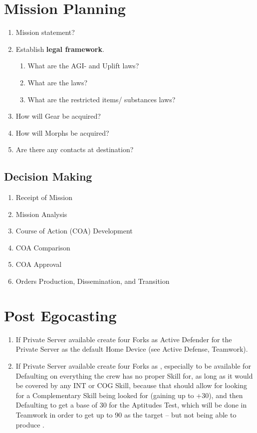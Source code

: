 
\section{Mission Planning}

\begin{enumerate}
    \item Mission statement?
    \item Establish \textbf{legal framework}. 
    \begin{enumerate}
        \item What are the AGI- and Uplift laws?
        \item What are the  laws?
        \item What are the restricted items/ substances laws?
    \end{enumerate}
    \item How will Gear be acquired?
    \item How will Morphs be acquired?
    \item Are there any contacts at destination?
\end{enumerate}


\subsection{Decision Making}

\begin{enumerate}
    \item Receipt of Mission
    \item Mission Analysis
    \item Course of Action (COA) Development
    \item COA Comparison
    \item COA Approval
    \item Orders Production, Dissemination, and Transition
\end{enumerate}


\section{Post Egocasting}

\begin{enumerate}
    \item If \gls{Private Server} available create four \glspl{Fork} as \gls{Active Defender} for the \gls{Private Server} as the default \gls{Home Device} (see \gls{Active Defense}, \gls{Teamwork}).
    \item If \gls{Private Server} available create four \glspl{Fork} as , especially to be available for \gls{Defaulting} on everything the crew has no proper Skill for, as long as it would be covered by any INT or COG Skill, because that should allow for looking for a \gls{Complementary Skill} being looked for (gaining up to +30), and then \gls{Defaulting} to get a base of 30 for the Aptitudes Test, which will be done in \gls{Teamwork} in order to get up to 90 as the target -- but not being able to produce .
\end{enumerate}


